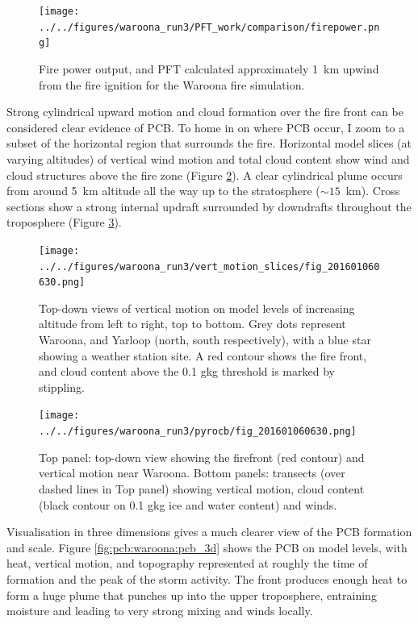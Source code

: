     \begin{figure}
      \texttt{[image: ../../figures/waroona\_run3/PFT\_work/comparison/firepower.png]}
      \caption{%
        Fire power output, and PFT calculated approximately 1~km upwind from the fire ignition for the Waroona fire simulation.
      }
      \label{fig:pcb:waroona:PFT}
    \end{figure}
    
    
    Strong cylindrical upward motion and cloud formation over the fire front can be considered clear evidence of PCB.
    To home in on where PCB occur, I zoom to a subset of the horizontal region that surrounds the fire. Horizontal model slices (at varying altitudes) of vertical wind motion and total cloud content show wind and cloud structures above the fire zone (Figure \ref{fig:pcb:waroona:vert_motion_slices}).
    A clear cylindrical plume occurs from around 5~km altitude all the way up to the stratosphere ($\sim 15$~km).
    Cross sections show a strong internal updraft surrounded by downdrafts throughout the troposphere (Figure \ref{fig:pcb:waroona:pcb_transects}).
    

    \begin{figure}
      \texttt{[image: ../../figures/waroona\_run3/vert\_motion\_slices/fig\_201601060630.png]}
      \caption{%
        Top-down views of vertical motion on model levels of increasing altitude from left to right, top to bottom. 
        Grey dots represent Waroona, and Yarloop (north, south respectively), with a blue star showing a weather station site.
        A red contour shows the fire front, and cloud content above the 0.1 g\/kg threshold is marked by stippling.
        }
      \label{fig:pcb:waroona:vert_motion_slices}
    \end{figure}
    
    \begin{figure}
      \texttt{[image: ../../figures/waroona\_run3/pyrocb/fig\_201601060630.png]}
      \caption{%
        Top panel: top-down view showing the firefront (red contour) and vertical motion near Waroona.
        Bottom panels: transects (over dashed lines in Top panel) showing vertical motion, cloud content (black contour on 0.1 g\/kg ice and water content) and winds.
      }
      \label{fig:pcb:waroona:pcb_transects}
    \end{figure}

    Visualisation in three dimensions gives a much clearer view of the PCB formation and scale. 
    Figure \ref{fig:pcb:waroona:pcb_3d} shows the PCB on model levels, with heat, vertical motion, and topography represented at roughly the time of formation and the peak of the storm activity.
    The front produces enough heat to form a huge plume that punches up into the upper troposphere, entraining moisture and leading to very strong mixing and winds locally.

